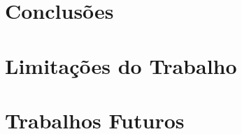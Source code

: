 \section{Conclus\~oes}
\label{sec:conclusoes}

\section{Limita\c{c}\~oes do Trabalho}
\label{sec:limitacoes}

\section{Trabalhos Futuros}
\label{sec:trabalhos_futuros}
